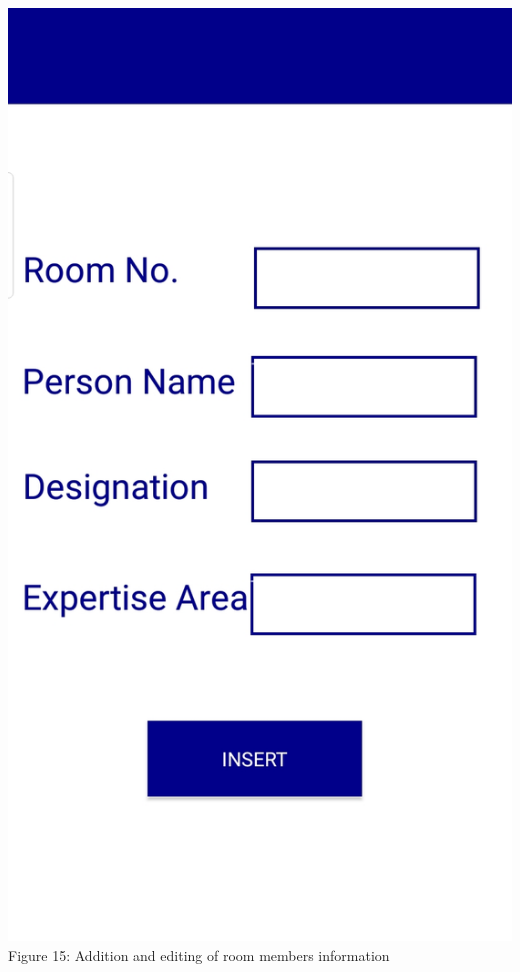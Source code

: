 \documentclass{article}
\begin{document}
\begin{center}
\includegraphics[scale=0.20]{f10}
\\Figure 15: Addition and editing of room members information
\end{center}
\end{document}
